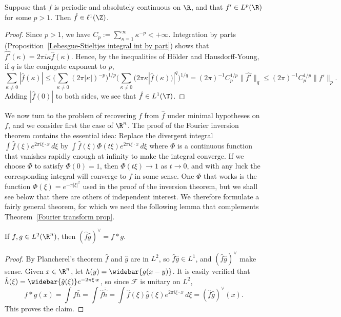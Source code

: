 \begin{theorem}\label{Fourier coefficient of ac function is l^1}
Suppose that $f$ is periodic and absolutely continuous on $\R$, and that $f'\in L^p(\R)$ for some $p>1$. Then $\hat{f}\in\ell^1(\Z)$.
\end{theorem}
\begin{proof}
Since $p>1$, we have $C_p:=\sum_{\kappa=1}^{\infty}\kappa^{-p}<+\infty$. Integration by parts (Proposition~\ref{Lebesgue-Stieltjes integral int by part}) shows that $\widehat{f'}(\kappa)=2\pi i\kappa\hat{f}(\kappa)$. Hence, by the inequalities of H\"older and Hausdorff-Young, if
$q$ is the conjugate exponent to $p$,
\[\sum_{\kappa\neq 0}|\hat{f}(\kappa)|\leq\Big(\sum_{\kappa\neq 0}(2\pi|\kappa|)^{-p}\Big)^{1/p}\Big(\sum_{\kappa\neq 0}(2\pi\kappa|\hat{f}(\kappa))|^q\Big)^{1/q}=(2\pi)^{-1}C_p^{1/p}\|\widehat{f'}\|_q\leq(2\pi)^{-1}C_p^{1/p}\|f'\|_p.\]
Adding $|\hat{f}(0)|$ to both sides, we see that $\hat{f}\in L^1(\T)$.
\end{proof}
We now tum to the problem of recovering $f$ from $\hat{f}$ under minimal hypotheses on $f$, and we consider first the case of $\R^n$. The proof of the Fourier inversion theorem contains the essential idea: Replace the divergent integral $\int\hat{f}(\xi)e^{2\pi i\xi\cdot x}\,d\xi$ by $\int\hat{f}(\xi)\Phi(t\xi)e^{2\pi i\xi\cdot x}\,d\xi$ where $\Phi$ is a continuous function that vanishes rapidly enough at infinity to make the integral converge. If we choose $\Phi$ to satisfy $\Phi(0)=1$, then $\Phi(t\xi)\to 1$ as $t\to 0$, and with any luck the corresponding integral will converge to $f$ in some sense. One $\Phi$ that works is the function $\Phi(\xi)=e^{-\pi|\xi|^2}$ used in the proof of the inversion theorem, but we shall see below that there are others of independent interest. We therefore formulate a fairly general theorem, for which we need the following lemma that complements Theorem~\ref{Fourier transform prop}.
\begin{lemma}\label{convolution fomula converse}
If $f,g\in L^2(\R^n)$, then $(\hat{f}\hat{g})^{\vee}=f\ast g$.
\end{lemma}
\begin{proof}
By Plancherel's theorem $\hat{f}$ and $\hat{g}$ are in $L^2$, so $\hat{f}\hat{g}\in L^1$, and $(\hat{f}\hat{g})^{\vee}$ make sense. Given $x\in\R^n$, let $h(y)=\widebar{g(x-y)}$. It is easily verified that $\hat{h}(\xi)=\widebar{\hat{g}(\xi)}e^{-2\pi\xi\cdot x}$, so since $\mathcal{F}$ is unitary on $L^2$,
\[f\ast g(x)=\int f\bar{h}=\int\hat{f}\bar{\hat{h}}=\int\hat{f}(\xi)\hat{g}(\xi)e^{2\pi i\xi\cdot x}\,d\xi=(\hat{f}\hat{g})^{\vee}(x).\]
This proves the claim.
\end{proof}
